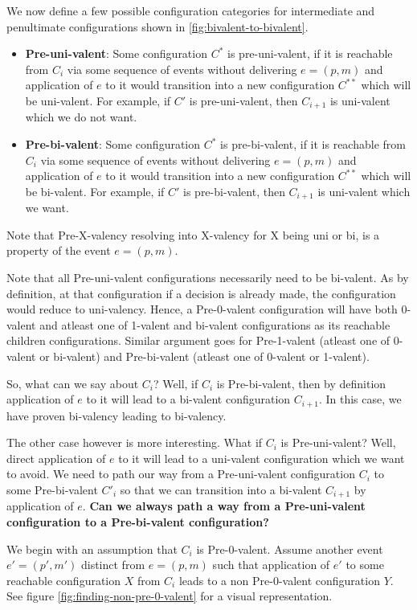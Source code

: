 We now define a few possible configuration categories for intermediate and penultimate configurations shown in \ref{fig:bivalent-to-bivalent}.

\begin{itemize}
    \item \textbf{Pre-uni-valent}: Some configuration $C^*$ is pre-uni-valent, if it is reachable from $C_i$ via some sequence of events without delivering $e = (p, m)$ and application of $e$ to it would transition into a new configuration $C^{**}$ which will be uni-valent. For example, if $C'$ is pre-uni-valent, then $C_{i+1}$ is uni-valent which we do not want.
    \item \textbf{Pre-bi-valent}: Some configuration $C^*$ is pre-bi-valent, if it is reachable from $C_i$ via some sequence of events without delivering $e = (p, m)$ and application of $e$ to it would transition into a new configuration $C^{**}$ which will be bi-valent. For example, if $C'$ is pre-bi-valent, then $C_{i+1}$ is uni-valent which we want.
\end{itemize}

Note that Pre-X-valency resolving into X-valency for X being uni or bi, is a property of the event $e = (p, m)$.

Note that all Pre-uni-valent configurations necessarily need to be bi-valent. As by definition, at that configuration if a decision is already made, the configuration would reduce to uni-valency. Hence, a Pre-0-valent configuration will have both 0-valent and atleast one of 1-valent and bi-valent configurations as its reachable children configurations. Similar argument goes for Pre-1-valent (atleast one of 0-valent or bi-valent) and Pre-bi-valent (atleast one of 0-valent or 1-valent).

So, what can we say about $C_i$? Well, if $C_i$ is Pre-bi-valent, then by definition application of $e$ to it will lead to a bi-valent configuration $C_{i+1}$. In this case, we have proven bi-valency leading to bi-valency.

The other case however is more interesting. What if $C_i$ is Pre-uni-valent? Well, direct application of $e$ to it will lead to a uni-valent configuration which we want to avoid. We need to path our way from a Pre-uni-valent configuration $C_i$ to some Pre-bi-valent $C'_{i}$ so that we can transition into a bi-valent $C_{i+1}$ by application of $e$. \textbf{Can we always path a way from a Pre-uni-valent configuration to a Pre-bi-valent configuration?}

We begin with an assumption that $C_i$ is Pre-0-valent. Assume another event $e' = (p', m')$ distinct from $e = (p, m)$ such that application of $e'$ to some reachable configuration $X$ from $C_i$ leads to a non Pre-0-valent configuration $Y$. See figure \ref{fig:finding-non-pre-0-valent} for a visual representation.

